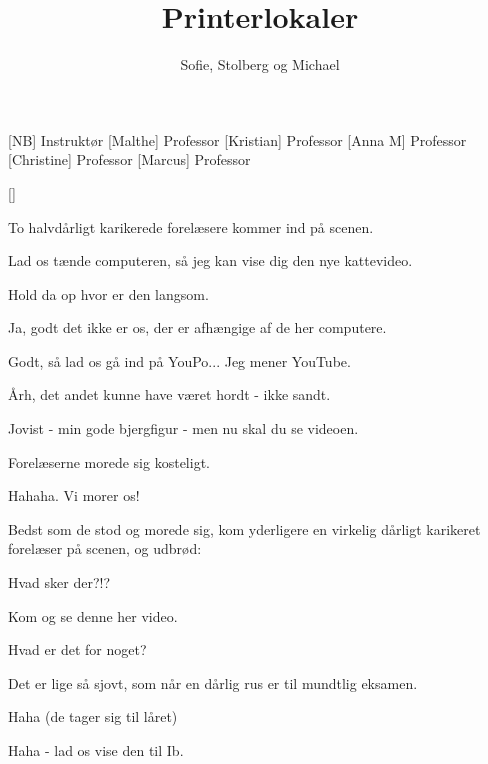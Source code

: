 \documentclass[a4paper,11pt]{article}
\title{Printerlokaler}
\author{Sofie, Stolberg og Michael}
\begin{document}
\maketitle

\begin{roles}
[NB] Instruktør
[Malthe] Professor
[Kristian] Professor
[Anna M] Professor
[Christine] Professor
[Marcus] Professor
\end{roles}

\begin{props}
[]
\end{props}
  
\begin{sketch}
 To halvdårligt karikerede forelæsere kommer ind på scenen.

 Lad os tænde computeren, så jeg kan vise dig den nye kattevideo.


 Hold da op hvor er den langsom.

 Ja, godt det ikke er os, der er afhængige af de her computere.


 Godt, så lad os gå ind på YouPo... Jeg mener YouTube.

 Årh, det andet kunne have været hordt - ikke sandt.

 Jovist - min gode bjergfigur - men nu skal du se videoen.


 Forelæserne morede sig kosteligt.

 Hahaha. Vi morer os!

 Bedst som de stod og morede sig, kom yderligere en virkelig dårligt karikeret forelæser på scenen, og udbrød:

 Hvad sker der?!?

 Kom og se denne her video.

 Hvad er det for noget?

 Det er lige så sjovt, som når en dårlig rus er til mundtlig eksamen.


 Haha (de tager sig til låret)

 Haha - lad os vise den til Ib.


\end{sketch}
\end{document}
